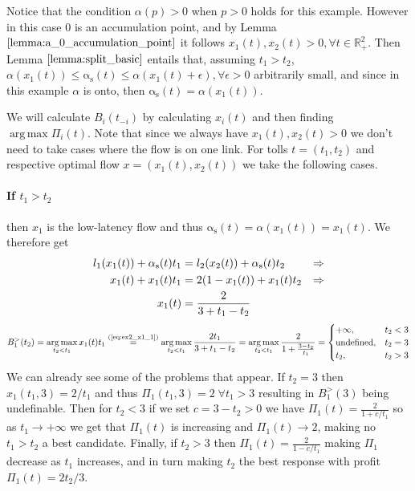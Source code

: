 \documentclass[10pt,a4paper]{book}
\newcommand{\indeq}[1]{\stackrel{\text{#1}}{=}}
\newcommand{\as}{\mathrm{\alpha_s}}
\newcommand{\R}{\mathbb{R}}
\DeclareMathOperator*{\argmax}{arg\,max}
\theoremstyle{definition}
\theoremstyle{comment}
\begin{document}
Notice that the condition $\alpha(p) > 0$ when $p > 0$ holds for this example.
However in this case $0$ is an accumulation point, and by Lemma $\ref{lemma:a_0_accumulation_point}$ it follows $x_1(t), x_2(t) > 0, \forall t \in \R_+^2$.
Then Lemma $\ref{lemma:split_basic}$ entails that, assuming $t_1 > t_2$, $\alpha(x_1(t)) \le \as(t) \le \alpha(x_1(t) + \epsilon), \forall \epsilon > 0$ arbitrarily small, and since in this example $\alpha$ is onto, then $\as(t) = \alpha(x_1(t))$.

We will calculate $B_i(t_{-i})$ by calculating $x_i(t)$ and then finding $\argmax \Pi_i(t)$.
Note that since we always have $x_1(t), x_2(t) > 0$ we don't need to take cases where the flow is on one link.
For tolls $t = (t_1, t_2)$ and respective optimal flow $x = (x_1(t), x_2(t))$ we take the following cases.

\paragraph{If $t_1 > t_2$}
then $x_1$ is the low-latency flow and thus $\as(t) = \alpha(x_1(t)) = x_1(t)$.
We therefore get
\begin{align}
	l_1(x_1(t)) + \as(t) t_1 &= l_2(x_2(t)) + \as(t) t_2 &\Rightarrow \notag \\
	x_1(t) + x_1(t) t_1 &= 2 (1 - x_1(t)) + x_1(t) t_2 &\Rightarrow \notag \\
	x_1(t) &= \frac{2}{3 + t_1 - t_2} \label{eq:ex2_x1_1}
\end{align}
\[
	B_1^>(t_2) = \argmax_{t_2 < t_1} x_1(t) t_1 \indeq{(\ref{eq:ex2_x1_1})} \argmax_{t_2 < t_1} \frac{2 t_1}{3 + t_1 - t_2} = \argmax_{t_2 < t_1} \frac{2}{1 + \frac{3 - t_2}{t_1}} =
		\begin{cases}
			+\infty, & t_2 < 3 \\
			\textrm{undefined}, & t_2 = 3 \\
			t_2, & t_2 > 3 \\
		\end{cases}
\]
We can already see some of the problems that appear.
If $t_2 = 3$ then $x_1(t_1, 3) = 2/t_1$ and thus $\Pi_1(t_1, 3) = 2 \; \forall t_1 > 3$ resulting in $B_1^>(3)$ being undefinable.
Then for $t_2 < 3$ if we set $c = 3 - t_2 > 0$ we have $\Pi_1(t) = \frac{2}{1 + c/t_1}$ so as $t_1 \rightarrow +\infty$ we get that $\Pi_1(t)$ is increasing and $\Pi_1(t) \rightarrow 2$, making no $t_1 > t_2$ a best candidate.
Finally, if $t_2 > 3$ then $\Pi_1(t) = \frac{2}{1 - c/t_1}$ making $\Pi_1$ decrease as $t_1$ increases, and in turn making $t_2$ the best response with profit $\Pi_1(t) = {2 t_2}/3$.
\end{document}
